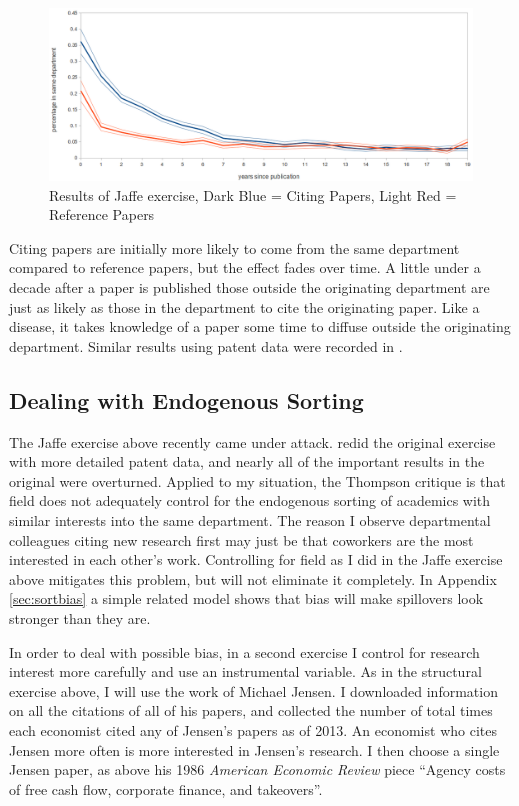 \begin{figure}[!htbp]
\centering
\includegraphics[scale=0.35]{pics/jaf_results_pooled.png}
\caption{Results of Jaffe exercise, Dark Blue = Citing Papers, Light Red =
Reference Papers}
\label{fig:jaf_ex}
\end{figure}

Citing papers are initially more likely to come from the same department
compared to reference papers, but the effect fades over time. A little
under a decade after a paper is published those outside the originating
department are just as likely as those in the department to cite the
originating paper. Like a disease, it takes knowledge of a paper some
time to diffuse outside the originating department. Similar results
using patent data were recorded in \citet{jaffe1993geographic}.

\subsection{Dealing with Endogenous Sorting}

The Jaffe exercise above recently came under attack.
\citet{thompson2005patent} redid the original exercise with more
detailed patent data, and nearly all of the important results in the
original were overturned. Applied to my situation, the Thompson critique
is that field does not adequately control for the endogenous sorting of
academics with similar interests into the same department. The reason I
observe departmental colleagues citing new research first may just be
that coworkers are the most interested in each other's work. Controlling
for field as I did in the Jaffe exercise above mitigates this problem,
but will not eliminate it completely. In Appendix \ref{sec:sortbias} a simple
related model shows that bias will make spillovers look stronger than they are.

In order to deal with possible bias, in a second exercise I control for
research interest more carefully and use an instrumental variable.
As in the structural exercise above, I will use the work of Michael Jensen.
I downloaded information on all the
citations of all of his papers, and collected the number of total times
each economist cited any of Jensen's papers as of 2013. An economist who
cites Jensen more often is more interested in Jensen's research. I then
choose a single Jensen paper, as above his 1986 \emph{American Economic Review} piece
``Agency costs of free cash flow, corporate finance, and takeovers''.

